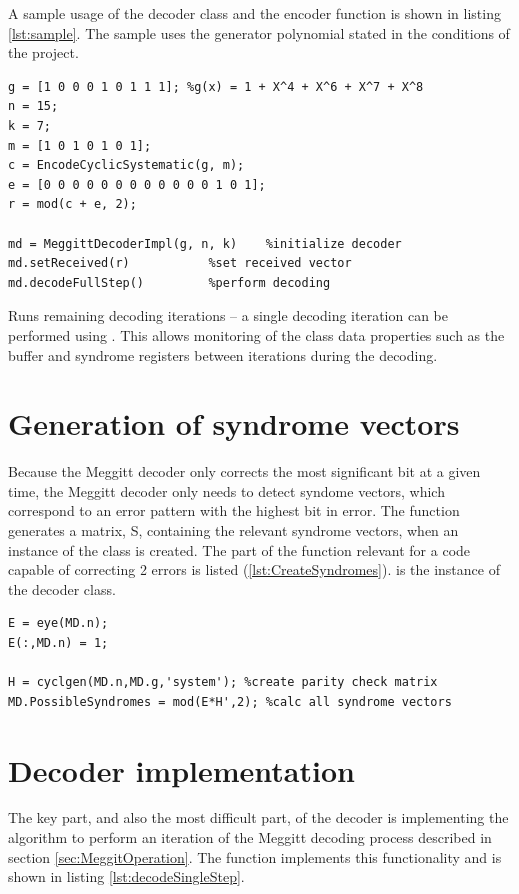 \documentclass[Main]{subfiles}
\begin{document}
A sample usage of the decoder class and the encoder function is shown in listing \ref{lst:sample}. The sample uses the generator polynomial stated in the conditions of the project.

\begin{lstlisting}[label={lst:sample},captionpos=b, caption=Sample usage of the decoder.] 
%setup
g = [1 0 0 0 1 0 1 1 1]; %g(x) = 1 + X^4 + X^6 + X^7 + X^8
n = 15;
k = 7;
m = [1 0 1 0 1 0 1];
c = EncodeCyclicSystematic(g, m);
e = [0 0 0 0 0 0 0 0 0 0 0 0 1 0 1];
r = mod(c + e, 2);

md = MeggittDecoderImpl(g, n, k)	%initialize decoder
md.setReceived(r)			%set received vector
md.decodeFullStep()			%perform decoding
\end{lstlisting}

 Runs remaining decoding iterations -- a single decoding iteration can be performed using . This allows monitoring of the class data properties such as the buffer and syndrome registers between iterations during the decoding.

\section{Generation of syndrome vectors}
Because the Meggitt decoder only corrects the most significant bit at a given time, the Meggitt decoder only needs to detect syndome vectors, which correspond to an error pattern with the highest bit in error. The function  generates a matrix, S, containing the relevant syndrome vectors, when an instance of the  class is created. The part of the function relevant for a code capable of correcting 2 errors is listed (\ref{lst:CreateSyndromes}).  is the instance of the decoder class.

\begin{lstlisting}[label={lst:CreateSyndromes},captionpos=b, caption=Creating possible syndrome vectors.] 
%create 2 bit error patterns with highest bit in error
E = eye(MD.n);
E(:,MD.n) = 1;

H = cyclgen(MD.n,MD.g,'system'); %create parity check matrix
MD.PossibleSyndromes = mod(E*H',2); %calc all syndrome vectors
\end{lstlisting}

\section{Decoder implementation}
The key part, and also the most difficult part, of the decoder is implementing the algorithm to perform an iteration of the Meggitt decoding process described in section \ref{sec:MeggitOperation}. The function  implements this functionality and is shown in listing \ref{lst:decodeSingleStep}.
\end{document}

